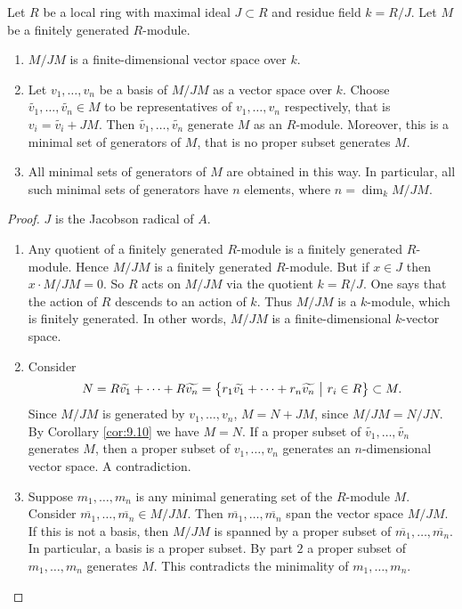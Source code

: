 \begin{theorem}
\label{thm:9.11}
Let $ R $ be a local ring with maximal ideal $ J \subset R $ and residue field $ k = R / J $. Let $ M $ be a finitely generated $ R $-module.
\begin{enumerate}
\item $ M / JM $ is a finite-dimensional vector space over $ k $.
\item Let $ v_1, \dots, v_n $ be a basis of $ M / JM $ as a vector space over $ k $. Choose $ \widetilde{v_1}, \dots, \widetilde{v_n} \in M $ to be representatives of $ v_1, \dots, v_n $ respectively, that is $ v_i = \widetilde{v_i} + JM $. Then $ \widetilde{v_1}, \dots, \widetilde{v_n} $ generate $ M $ as an $ R $-module. Moreover, this is a minimal set of generators of $ M $, that is no proper subset generates $ M $.
\item All minimal sets of generators of $ M $ are obtained in this way. In particular, all such minimal sets of generators have $ n $ elements, where $ n = \dim_k M / JM $.
\end{enumerate}
\end{theorem}

\begin{proof}
$ J $ is the Jacobson radical of $ A $.
\begin{enumerate}
\item Any quotient of a finitely generated $ R $-module is a finitely generated $ R $-module. Hence $ M / JM $ is a finitely generated $ R $-module. But if $ x \in J $ then $ x \cdot M / JM = 0 $. So $ R $ acts on $ M / JM $ via the quotient $ k = R / J $. One says that the action of $ R $ descends to an action of $ k $. Thus $ M / JM $ is a $ k $-module, which is finitely generated. In other words, $ M / JM $ is a finite-dimensional $ k $-vector space.
\item Consider
$$ N = R\widetilde{v_1} + \dots + R\widetilde{v_n} = \cbr{r_1\widetilde{v_1} + \dots + r_n\widetilde{v_n} \st r_i \in R} \subset M. $$
Since $ M / JM $ is generated by $ v_1, \dots, v_n $, $ M = N + JM $, since $ M / JM = N / JN $. By Corollary \ref{cor:9.10} we have $ M = N $. If a proper subset of $ \widetilde{v_1}, \dots, \widetilde{v_n} $ generates $ M $, then a proper subset of $ v_1, \dots, v_n $ generates an $ n $-dimensional vector space. A contradiction.


\item Suppose $ m_1, \dots, m_n $ is any minimal generating set of the $ R $-module $ M $. Consider $ \overline{m_1}, \dots, \overline{m_n} \in M / JM $. Then $ \overline{m_1}, \dots, \overline{m_n} $ span the vector space $ M / JM $. If this is not a basis, then $ M / JM $ is spanned by a proper subset of $ \overline{m_1}, \dots, \overline{m_n} $. In particular, a basis is a proper subset. By part $ 2 $ a proper subset of $ m_1, \dots, m_n $ generates $ M $. This contradicts the minimality of $ m_1, \dots, m_n $.
\end{enumerate}
\end{proof}

